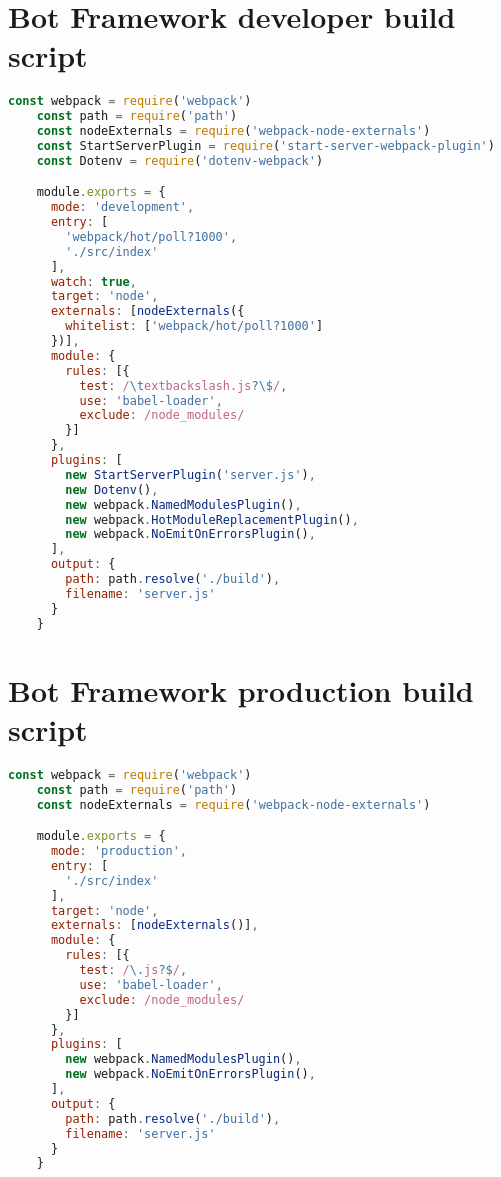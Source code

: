 \begin{appendices}
  \chapter{Bot Framework developer build script}\label{appendix:botframeworkdevscript}
  \begin{lstlisting}[language=JavaScript]
    const webpack = require('webpack')
    const path = require('path')
    const nodeExternals = require('webpack-node-externals')
    const StartServerPlugin = require('start-server-webpack-plugin')
    const Dotenv = require('dotenv-webpack')

    module.exports = {
      mode: 'development',
      entry: [
        'webpack/hot/poll?1000',
        './src/index'
      ],
      watch: true,
      target: 'node',
      externals: [nodeExternals({
        whitelist: ['webpack/hot/poll?1000']
      })],
      module: {
        rules: [{
          test: /\textbackslash.js?\$/,
          use: 'babel-loader',
          exclude: /node_modules/
        }]
      },
      plugins: [
        new StartServerPlugin('server.js'),
        new Dotenv(),
        new webpack.NamedModulesPlugin(),
        new webpack.HotModuleReplacementPlugin(),
        new webpack.NoEmitOnErrorsPlugin(),
      ],
      output: {
        path: path.resolve('./build'),
        filename: 'server.js'
      }
    }
  \end{lstlisting}

  \chapter{Bot Framework production build script}\label{appendix:botframeworkprodscript}
  \begin{lstlisting}[language=JavaScript]
    const webpack = require('webpack')
    const path = require('path')
    const nodeExternals = require('webpack-node-externals')

    module.exports = {
      mode: 'production',
      entry: [
        './src/index'
      ],
      target: 'node',
      externals: [nodeExternals()],
      module: {
        rules: [{
          test: /\.js?$/,
          use: 'babel-loader',
          exclude: /node_modules/
        }]
      },
      plugins: [
        new webpack.NamedModulesPlugin(),
        new webpack.NoEmitOnErrorsPlugin(),
      ],
      output: {
        path: path.resolve('./build'),
        filename: 'server.js'
      }
    }
  \end{lstlisting}
\end{appendices}